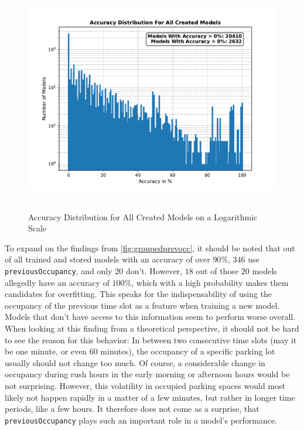   \begin{figure}[htbp]
    \centering
    \includegraphics[height=10cm]{plots/totalmodels.pdf}
    \caption{Accuracy Distribution for All Created Models on a Logarithmic Scale}
    \label{fig:totalmodels}
  \end{figure}
  
  To expand on the findings from \autoref{fig:groupedprevocc}, it should be noted that out of all trained and stored models with an accuracy of over $90\%$, $346$ use \texttt{previousOccupancy}, and only $20$ don't. However, $18$ out of those $20$ models allegedly have an accuracy of $100\%$, which with a high probability makes them candidates for overfitting. This speaks for the indispensability of using the occupancy of the previous time slot as a feature when training a new model. Models that don't have access to this information seem to perform worse overall. When looking at this finding from a theoretical perspective, it should not be hard to see the reason for this behavior: In between two consecutive time slots (may it be one minute, or even 60 minutes), the occupancy of a specific parking lot usually should not change too much. Of course, a considerable change in occupancy during rush hours in the early morning or afternoon hours would be not surprising. However, this volatility in occupied parking spaces would most likely not happen rapidly in a matter of a few minutes, but rather in longer time periods, like a few hours. It therefore does not come as a surprise, that \texttt{previousOccupancy} plays such an important role in a model's performance.

 

